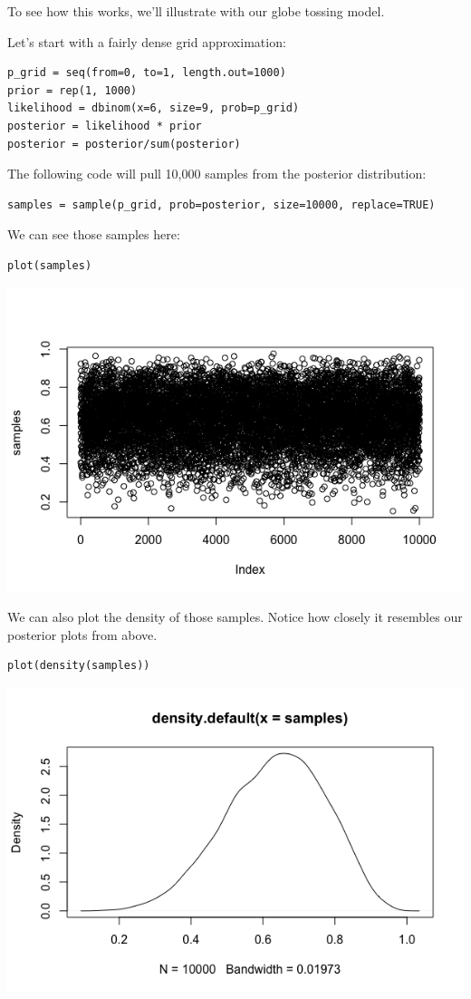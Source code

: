 \documentclass[11pt]{article}
\begin{document}
To see how this works, we'll illustrate with our globe tossing model.

Let's start with a fairly dense grid approximation:

\begin{verbatim}
p_grid = seq(from=0, to=1, length.out=1000)
prior = rep(1, 1000)
likelihood = dbinom(x=6, size=9, prob=p_grid)
posterior = likelihood * prior
posterior = posterior/sum(posterior)
\end{verbatim}

The following code will pull 10,000 samples from the posterior distribution:

\begin{verbatim}
samples = sample(p_grid, prob=posterior, size=10000, replace=TRUE)
\end{verbatim}

We can see those samples here:

\begin{verbatim}
plot(samples)
\end{verbatim}

\includegraphics[width=.9\linewidth]{figures/week8/samples.png}

We can also plot the density of those samples.  Notice how closely it resembles our posterior plots from above.

\begin{verbatim}
plot(density(samples))
\end{verbatim}

\includegraphics[width=.9\linewidth]{figures/week8/density.png}
\end{document}
